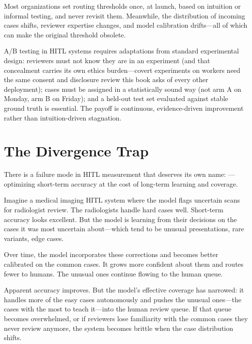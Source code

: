 Most organizations set routing thresholds once, at launch, based on intuition or informal testing, and never revisit them. Meanwhile, the distribution of incoming cases shifts, reviewer expertise changes, and model calibration drifts---all of which can make the original threshold obsolete.

\begin{keyconcept}
A/B testing in HITL systems requires adaptations from standard experimental design: reviewers must not know they are in an experiment (and that concealment carries its own ethics burden---covert experiments on workers need the same consent and disclosure review this book asks of every other deployment); cases must be assigned in a statistically sound way (not arm A on Monday, arm B on Friday); and a held-out test set evaluated against stable ground truth is essential. The payoff is continuous, evidence-driven improvement rather than intuition-driven stagnation.
\end{keyconcept}

\section{The Divergence Trap}
\label{sec:divergence-trap}

There is a failure mode in HITL measurement that deserves its own name: ---optimizing short-term accuracy at the cost of long-term learning and coverage.

Imagine a medical imaging HITL system where the model flags uncertain scans for radiologist review. The radiologists handle hard cases well. Short-term accuracy looks excellent. But the model is learning from their decisions on the cases it was most uncertain about---which tend to be unusual presentations, rare variants, edge cases.

Over time, the model incorporates these corrections and becomes better calibrated on the common cases. It grows more confident about them and routes fewer to humans. The unusual ones continue flowing to the human queue.

Apparent accuracy improves. But the model's effective coverage has narrowed: it handles more of the easy cases autonomously and pushes the unusual ones---the cases with the most to teach it---into the human review queue. If that queue becomes overwhelmed, or if reviewers lose familiarity with the common cases they never review anymore, the system becomes brittle when the case distribution shifts.

